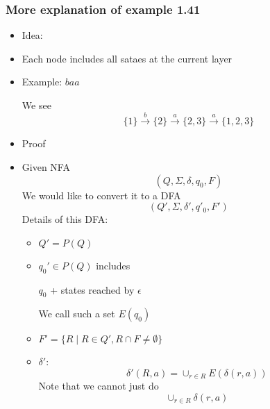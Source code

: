 \begin{frame}[allowframebreaks] \frametitle{More explanation
    of example 1.41}
\begin{itemize}

\item Idea: 

  
\item [] Each node includes all sataes at the current layer
  
\item Example: $baa$


  \begin{center}
\end{center}
We see
\begin{equation*}
  \{1\} \xrightarrow{b} \{2\} \xrightarrow{a} \{2, 3\}
  \xrightarrow{a} \{1, 2, 3\}
\end{equation*}
\item Proof
  \item[] Given NFA
    \begin{equation*}
(Q,\Sigma, \delta, q_0, F)
\end{equation*}
We would like to convert it to a DFA
\begin{equation*}
(Q', \Sigma, \delta', q'_0, F')
\end{equation*}
Details of this DFA:
\begin{itemize}
\item $Q'=P(Q)$
\item $q_0' \in P(Q)$ includes
  \begin{center}
 $q_0$ + states
reached by $\epsilon$
\end{center}
We call such a set $E(q_0)$
\item $F'=
\{R\mid R \in Q', R \cap F\neq \emptyset\}$
\item $\delta'$:
  \begin{equation*}
    \delta'(R,a)=
\cup_{r\in R} E(\delta(r,a))
\end{equation*}
Note that we cannot just do
\begin{equation*}
\cup_{r\in R}\delta(r,a)
\end{equation*}
\end{itemize}
\end{itemize}\end{frame}


